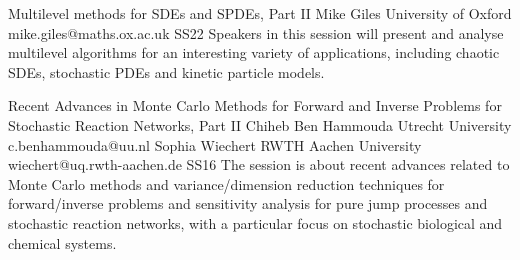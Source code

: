 \documentclass[12pt,a4paper,figuresright]{book}
\begin{document}


%


\clearpage
\begin{session}
 {Multilevel methods for SDEs and SPDEs, Part II}%
 {Mike Giles}%
 {University of Oxford}%
 {mike.giles@maths.ox.ac.uk}%
 {}%
 {}%
 {}%
 {SS22}%
 {}%
 Speakers in this session will present and analyse multilevel algorithms for an interesting variety of applications, including chaotic SDEs, stochastic PDEs and kinetic particle models.
\end{session}

%


\clearpage

\begin{session}
 {Recent Advances in Monte Carlo Methods for Forward and Inverse Problems for Stochastic Reaction Networks, Part II}%
 {Chiheb Ben Hammouda}%
 {Utrecht University}%
 {c.benhammouda@uu.nl}%
 {Sophia Wiechert}%
 {RWTH Aachen University}%
 {wiechert@uq.rwth-aachen.de}%
 {SS16}
 {}%
The session is about recent advances related to Monte Carlo methods and variance/dimension reduction techniques for forward/inverse problems and sensitivity analysis for pure jump processes and stochastic reaction networks, with a particular focus on stochastic biological and chemical systems.
\end{session}

%


\clearpage
\end{document}
